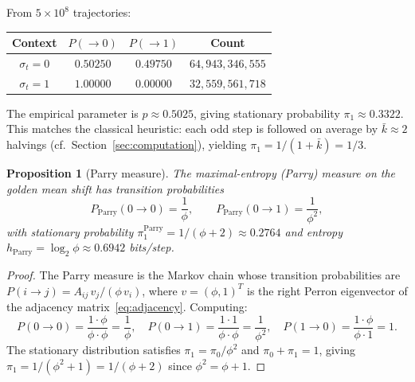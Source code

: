 \documentclass[11pt,a4paper]{article}
\theoremstyle{plain}
\newtheorem{proposition}[theorem]{Proposition}
\theoremstyle{definition}
\begin{document}
\begin{empirical}
\label{obs:collatz-transition}
    From $5 \times 10^8$ trajectories:
    \begin{center}
    \renewcommand{\arraystretch}{1.15}
    \begin{tabular}{cccc}
        \toprule
        Context & $P(\to 0)$ & $P(\to 1)$ & Count \\
        \midrule
        $\sigma_t = 0$ & $0.50250$ & $0.49750$
            & $64{,}943{,}346{,}555$ \\
        $\sigma_t = 1$ & $1.00000$ & $0.00000$
            & $32{,}559{,}561{,}718$ \\
        \bottomrule
    \end{tabular}
    \end{center}
    The empirical parameter is $p \approx 0.5025$, giving stationary
    probability $\pi_1 \approx 0.3322$.  This matches the classical
    heuristic: each odd step is followed on average by
    $\bar{k} \approx 2$ halvings
    (cf.\ Section~\ref{sec:computation}), yielding
    $\pi_1 = 1/(1 + \bar{k}) = 1/3$.
\end{empirical}

\begin{proposition}[Parry measure]\label{prop:parry}
    The maximal-entropy (Parry) measure on the golden mean shift has
    transition probabilities
    \begin{equation}
        P_{\mathrm{Parry}}(0 \to 0) = \frac{1}{\phi}, \qquad
        P_{\mathrm{Parry}}(0 \to 1) = \frac{1}{\phi^2},
    \end{equation}
    with stationary probability
    $\pi_1^{\mathrm{Parry}} = 1/(\phi + 2) \approx 0.2764$ and
    entropy $h_{\mathrm{Parry}} = \log_2 \phi \approx 0.6942$
    bits/step.
\end{proposition}

\begin{proof}
    The Parry measure is the Markov chain whose transition
    probabilities are
    $P(i \to j) = A_{ij}\, v_j / (\phi\, v_i)$, where
    $v = (\phi, 1)^T$ is the right Perron eigenvector of the
    adjacency matrix~\eqref{eq:adjacency}.  Computing:
    \[
        P(0 \to 0)
            = \frac{1 \cdot \phi}{\phi \cdot \phi}
            = \frac{1}{\phi}, \quad
        P(0 \to 1)
            = \frac{1 \cdot 1}{\phi \cdot \phi}
            = \frac{1}{\phi^2}, \quad
        P(1 \to 0)
            = \frac{1 \cdot \phi}{\phi \cdot 1}
            = 1.
    \]
    The stationary distribution satisfies
    $\pi_1 = \pi_0 / \phi^2$ and $\pi_0 + \pi_1 = 1$, giving
    $\pi_1 = 1/(\phi^2 + 1) = 1/(\phi + 2)$ since
    $\phi^2 = \phi + 1$.
\end{proof}
\end{document}
